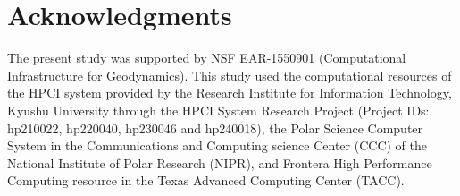 \section*{Acknowledgments}
The present study was supported by NSF EAR-1550901 (Computational Infrastructure for Geodynamics).
This study used the computational resources of the HPCI system provided by the Research Institute for Information Technology, Kyushu University through the HPCI System Research Project (Project IDs: hp210022, hp220040, hp230046 and hp240018), the Polar Science Computer System in the Communications and Computing science Center (CCC) of the National Institute of Polar Research (NIPR), and Frontera High Performance Computing resource in the Texas Advanced Computing Center (TACC). 
